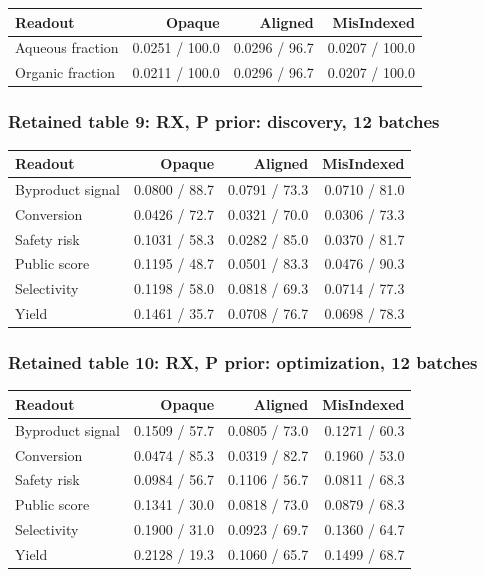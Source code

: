 \documentclass[10pt,a4paper]{article}
\begin{document}
{\def\LTcaptype{table} %
\small\begin{longtable}[]{@{}lrrr@{}}
\toprule\noalign{}
Readout & Opaque & Aligned & MisIndexed \\
\midrule\noalign{}
\endhead
\bottomrule\noalign{}
\endlastfoot
Aqueous fraction & 0.0251 / 100.0 & 0.0296 / 96.7 & 0.0207 / 100.0 \\
Organic fraction & 0.0211 / 100.0 & 0.0296 / 96.7 & 0.0207 / 100.0 \\
\end{longtable}\normalsize
}

\subsubsection{Retained table 9: RX, P prior: discovery, 12 batches}\label{retained-table-9-rx-p-prior-discovery-12-batches}

{\def\LTcaptype{table} %
\small\begin{longtable}[]{@{}lrrr@{}}
\toprule\noalign{}
Readout & Opaque & Aligned & MisIndexed \\
\midrule\noalign{}
\endhead
\bottomrule\noalign{}
\endlastfoot
Byproduct signal & 0.0800 / 88.7 & 0.0791 / 73.3 & 0.0710 / 81.0 \\
Conversion & 0.0426 / 72.7 & 0.0321 / 70.0 & 0.0306 / 73.3 \\
Safety risk & 0.1031 / 58.3 & 0.0282 / 85.0 & 0.0370 / 81.7 \\
Public score & 0.1195 / 48.7 & 0.0501 / 83.3 & 0.0476 / 90.3 \\
Selectivity & 0.1198 / 58.0 & 0.0818 / 69.3 & 0.0714 / 77.3 \\
Yield & 0.1461 / 35.7 & 0.0708 / 76.7 & 0.0698 / 78.3 \\
\end{longtable}\normalsize
}

\subsubsection{Retained table 10: RX, P prior: optimization, 12 batches}\label{retained-table-10-rx-p-prior-optimization-12-batches}

{\def\LTcaptype{table} %
\small\begin{longtable}[]{@{}lrrr@{}}
\toprule\noalign{}
Readout & Opaque & Aligned & MisIndexed \\
\midrule\noalign{}
\endhead
\bottomrule\noalign{}
\endlastfoot
Byproduct signal & 0.1509 / 57.7 & 0.0805 / 73.0 & 0.1271 / 60.3 \\
Conversion & 0.0474 / 85.3 & 0.0319 / 82.7 & 0.1960 / 53.0 \\
Safety risk & 0.0984 / 56.7 & 0.1106 / 56.7 & 0.0811 / 68.3 \\
Public score & 0.1341 / 30.0 & 0.0818 / 73.0 & 0.0879 / 68.3 \\
Selectivity & 0.1900 / 31.0 & 0.0923 / 69.7 & 0.1360 / 64.7 \\
Yield & 0.2128 / 19.3 & 0.1060 / 65.7 & 0.1499 / 68.7 \\
\end{longtable}\normalsize
}
\end{document}
